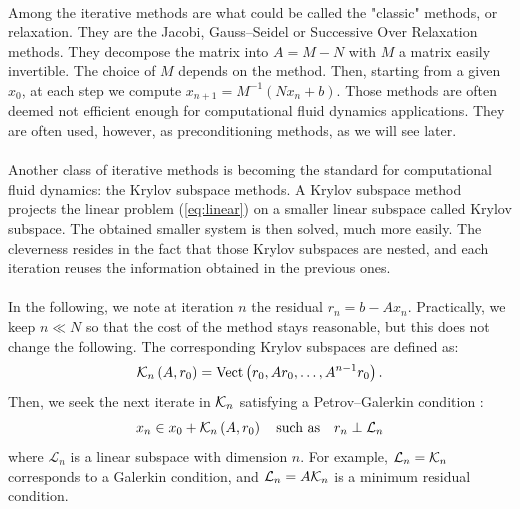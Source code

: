       \paragraph{}
      Among the iterative methods are what could be called the "classic" methods, or relaxation.
      They are the Jacobi, Gauss--Seidel or Successive Over Relaxation methods.
      They decompose the matrix into $A = M - N$ with $M$ a matrix easily invertible.
      The choice of $M$ depends on the method.
      Then, starting from a given $x_0$, at each step we compute $x_{n+1} = M^{-1} \left( N x_n + b \right)$.
      Those methods are often deemed not efficient enough for computational fluid dynamics applications.
      They are often used, however, as preconditioning methods, as we will see later.

      \paragraph{}
      Another class of iterative methods is becoming the standard for computational fluid dynamics: the Krylov subspace methods.
      A Krylov subspace method projects the linear problem (\ref{eq:linear}) on a smaller linear subspace called Krylov subspace.
      The obtained smaller system is then solved, much more easily.
      The cleverness resides in the fact that those Krylov subspaces are nested, and each iteration reuses the information obtained in the previous ones.

      \paragraph{}
      In the following, we note at iteration $n$ the residual $r_n = b - A x_n$.
      Practically, we keep $n \ll N$ so that the cost of the method stays reasonable, but this does not change the following.
      The corresponding Krylov subspaces are defined as:
  		\begin{equation}
  			\krylov[A, r_0]{n} = \operatorname{Vect}\left( r_0, A r_0, \dots, A^{n-1} r_0 \right) .
  		\end{equation}
      Then, we seek the next iterate in $\krylov{n}$ satisfying a Petrov--Galerkin condition \cite{SimonciniSzyld2007}:
  		\begin{equation}
  			x_n \in x_0 + \krylov[A, r_0]{n} \quad \textrm{such as} \quad r_n \perp \mathcal{L}_n
  		\end{equation}
      where $\mathcal{L}_n$ is a linear subspace with dimension $n$.
      For example, $\mathcal{L}_n = \krylov{n}$ corresponds to a Galerkin condition, and $\mathcal{L}_n = A \krylov{n}$ is a minimum residual condition.

